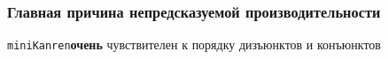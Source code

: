 \documentclass{beamer}
\newcommand{\miniKanren}{\texttt{miniKanren}\xspace}
\begin{document}
\begin{frame}[fragile]
\begin{columns}
\begin{column}[]{0.6\textwidth}
\begin{center}
      \end{center}
    \end{column}
  \end{columns}
\end{frame}

\begin{frame}[fragile]
  \frametitle{Главная причина непредсказуемой производительности}
  \begin{center}
    \miniKanren \textbf{очень} чувствителен к порядку дизъюнктов и конъюнктов
  \end{center}
\end{frame}
\end{document}

